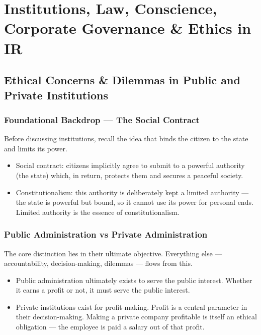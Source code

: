 \chapter{Institutions, Law, Conscience, Corporate Governance \& Ethics in IR}
\label{ch:institutions-law-conscience-corporate-ir}

\section{Ethical Concerns \& Dilemmas in Public and Private Institutions}

\subsection{Foundational Backdrop --- The Social Contract}
Before discussing institutions, recall the idea that binds the citizen to the state and limits its power.

\begin{KeyConcept}
\begin{itemize}
\item Social contract: citizens implicitly agree to submit to a powerful authority (the state) which, in return, protects them and secures a peaceful society.
\item Constitutionalism: this authority is deliberately kept a limited authority --- the state is powerful but bound, so it cannot use its power for personal ends. Limited authority is the essence of constitutionalism.
\end{itemize}
\end{KeyConcept}

\subsection{Public Administration vs Private Administration}
The core distinction lies in their ultimate objective. Everything else --- accountability, decision-making, dilemmas --- flows from this.

\begin{KeyConcept}
\begin{itemize}
\item Public administration ultimately exists to serve the public interest. Whether it earns a profit or not, it must serve the public interest.
\item Private institutions exist for profit-making. Profit is a central parameter in their decision-making. Making a private company profitable is itself an ethical obligation --- the employee is paid a salary out of that profit.
\end{itemize}
\end{KeyConcept}

